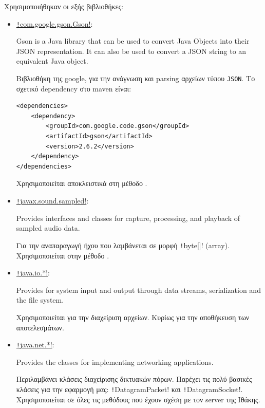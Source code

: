 Χρησιμοποιήθηκαν οι εξής βιβλιοθήκες:
\begin{itemize}
\item \label{lib:Gson}
\href{https://github.com/google/gson}{\texttt!com.google.gson.Gson!}:
\begin{displayquote}
Gson is a Java library that can be used to convert Java Objects into their JSON representation. It can also be used to convert a JSON string to an equivalent Java object.
\end{displayquote}
Βιβλιοθήκη της google, για την ανάγνωση και parsing αρχείων τύπου \texttt{JSON}.
Το σχετικό dependency στο maven είναι:
\begin{verbatim}
<dependencies>
    <dependency>
        <groupId>com.google.code.gson</groupId>
        <artifactId>gson</artifactId>
        <version>2.6.2</version>
    </dependency>
</dependencies>
\end{verbatim}
Χρησιμοποιείται αποκλειστικά στη μέθοδο .

\item
\href{https://docs.oracle.com/javase/8/docs/api/javax/sound/sampled/package-summary.html}{\texttt!javax.sound.sampled!}:
\begin{displayquote}
Provides interfaces and classes for capture, processing, and playback of sampled audio data.
\end{displayquote}
Για την αναπαραγωγή ήχου που λαμβάνεται σε μορφή \texttt!byte[]! (array).
Χρησιμοποιείται στην μέθοδο .

\item
\href{https://docs.oracle.com/javase/8/docs/api/java/io/package-summary.html}{\texttt!java.io.*!}:
\begin{displayquote}
Provides for system input and output through data streams, serialization and the file system.
\end{displayquote}
Χρησιμοποιείται για την διαχείριση αρχείων. Κυρίως για την αποθήκευση των αποτελεσμάτων.

\item
\href{https://docs.oracle.com/javase/8/docs/api/java/net/package-summary.html}{\texttt!java.net.*!}:
\begin{displayquote}
Provides the classes for implementing networking applications.
\end{displayquote}
Περιλαμβάνει κλάσεις διαχείρισης δικτυακών πόρων.
Παρέχει τις πολύ βασικές κλάσεις για την εφαρμογή μας:
\texttt!DatagramPacket! και \texttt!DatagramSocket!.
Χρησιμοποιείται σε όλες τις μεθόδους που έχουν σχέση με τον server της Ιθάκης.


\end{itemize}
